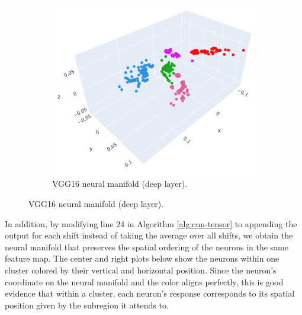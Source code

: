\begin{figure}[H]
\begin{subfigure}[b]{0.45\textwidth}
    \includegraphics[width=\textwidth]{figures/embeddings/VGG16-2D-block3.png}
    \caption{VGG16 neural manifold (deep layer).}
\end{subfigure}
\end{figure}

In addition, by modifying line 24 in Algorithm \ref{alg:cnn-tensor} to appending the output for each shift instead of taking the average over all shifts, we obtain the neural manifold that preserves the spatial ordering of the neurons in the same feature map. The center and right plots below show the neurons within one cluster colored by their vertical and horizontal position. Since the neuron's coordinate on the neural manifold and the color aligns perfectly, this is good evidence that within a cluster, each neuron’s response corresponds to its spatial position given by the subregion it attends to.

